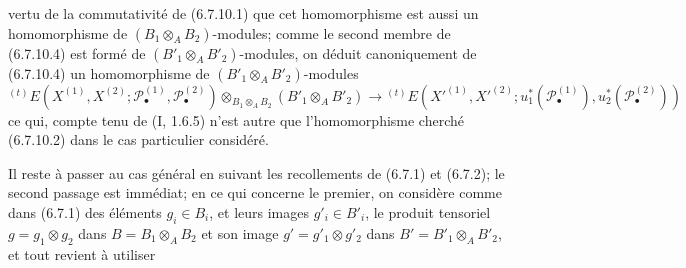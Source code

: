 vertu de la commutativité de (6.7.10.1) que cet homomorphisme est aussi un
homomorphisme de $(B_1\otimes_A B_2)$-modules; comme le second membre de
(6.7.10.4) est formé de $(B'_1\otimes_A B'_2)$-modules, on déduit
canoniquement de (6.7.10.4) un homomorphisme de
$(B'_1\otimes_A B'_2)$-modules
\[
  {}^{(t)}E
  (X^{(1)},X^{(2)};\mathscr P_\bullet^{(1)},\mathscr P_\bullet^{(2)})
  \otimes_{B_1\otimes_A B_2}(B'_1\otimes_A B'_2)
  \longrightarrow
  {}^{(t)}E
  (X'^{(1)},X'^{(2)};
   u_1^*(\mathscr P_\bullet^{(1)}),u_2^*(\mathscr P_\bullet^{(2)}))
  \tag{6.7.10.5}\label{III.6.7.10.5.fr}
\]
ce qui, compte tenu de (I, 1.6.5) n'est autre que l'homomorphisme cherché
(6.7.10.2) dans le cas particulier considéré.

Il reste à passer au cas général en suivant les recollements de (6.7.1) et
(6.7.2); le second passage est immédiat; en ce qui concerne le premier, on
considère comme dans (6.7.1) des éléments $g_i\in B_i$, et leurs images
$g'_i\in B'_i$, le produit tensoriel $g=g_1\otimes g_2$ dans
$B=B_1\otimes_A B_2$ et son image $g'=g'_1\otimes g'_2$ dans
$B'=B'_1\otimes_A B'_2$, et tout revient à utiliser

